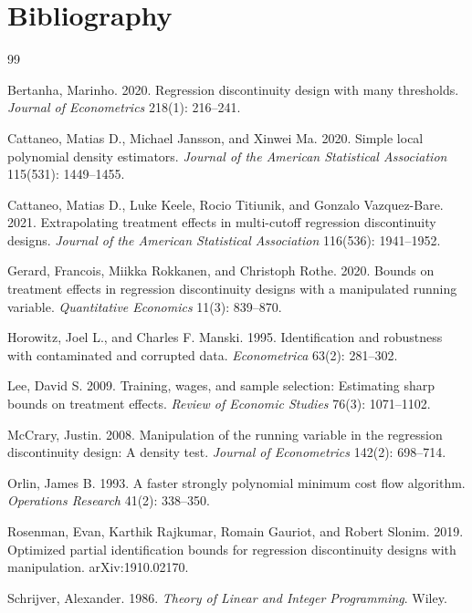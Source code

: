 \documentclass[11pt]{article}
\theoremstyle{definition}
\theoremstyle{plain}
\theoremstyle{remark}
\begin{document}
\section*{Bibliography}
\begin{thebibliography}{99}

Bertanha, Marinho.
2020.
Regression discontinuity design with many thresholds.
\emph{Journal of Econometrics} 218(1): 216--241.

Cattaneo, Matias D., Michael Jansson, and Xinwei Ma.
2020.
Simple local polynomial density estimators.
\emph{Journal of the American Statistical Association} 115(531): 1449--1455.

Cattaneo, Matias D., Luke Keele, Rocio Titiunik, and Gonzalo Vazquez-Bare.
2021.
Extrapolating treatment effects in multi-cutoff regression discontinuity designs.
\emph{Journal of the American Statistical Association} 116(536): 1941--1952.

Gerard, Francois, Miikka Rokkanen, and Christoph Rothe.
2020.
Bounds on treatment effects in regression discontinuity designs with a manipulated running variable.
\emph{Quantitative Economics} 11(3): 839--870.

Horowitz, Joel L., and Charles F. Manski.
1995.
Identification and robustness with contaminated and corrupted data.
\emph{Econometrica} 63(2): 281--302.

Lee, David S.
2009.
Training, wages, and sample selection: Estimating sharp bounds on treatment effects.
\emph{Review of Economic Studies} 76(3): 1071--1102.

McCrary, Justin.
2008.
Manipulation of the running variable in the regression discontinuity design: A density test.
\emph{Journal of Econometrics} 142(2): 698--714.

Orlin, James B.
1993.
A faster strongly polynomial minimum cost flow algorithm.
\emph{Operations Research} 41(2): 338--350.

Rosenman, Evan, Karthik Rajkumar, Romain Gauriot, and Robert Slonim.
2019.
Optimized partial identification bounds for regression discontinuity designs with manipulation.
arXiv:1910.02170.

Schrijver, Alexander.
1986.
\emph{Theory of Linear and Integer Programming}.
Wiley.

\end{thebibliography}
\end{document}
